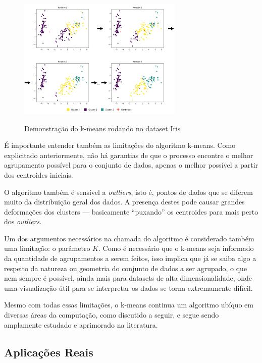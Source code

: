 \documentclass[12pt,
openright, 
oneside, %
a4paper,    %
brazil]{facom-ufu-abntex2}
\begin{document}
\begin{figure}[h]
  \caption{Demonstração do k-means rodando no dataset Iris}
  \centering
  \includegraphics[width=0.7\textwidth]{demo_kmeans_iris.png}
  \label{fig:kMeansDemoIris}
\end{figure}

É importante entender também as limitações do algoritmo k-means. Como explicitado anteriormente, não há garantias de que o processo encontre o melhor agrupamento possível para o conjunto de dados, apenas o melhor possível a partir dos centroides iniciais.

O algoritmo também é sensível a \textit{outliers}, isto é, pontos de dados que se diferem muito da distribuição geral dos dados. A presença destes pode causar grandes deformações dos clusters --- basicamente \enquote{puxando} os centroides para mais perto dos \textit{outliers}.

Um dos argumentos necessários na chamada do algoritmo é considerado também uma limitação: o parâmetro $K$. Como é necessário que o k-means seja informado da quantidade de agrupamentos a serem feitos, isso implica que já se saiba algo a respeito da natureza ou geometria do conjunto de dados a ser agrupado, o que nem sempre é possível, ainda mais para datasets de alta dimensionalidade, onde uma visualização útil para se interpretar os dados se torna extremamente difícil.

Mesmo com todas essas limitações, o k-means continua um algoritmo ubíquo em diversas áreas da computação, como discutido a seguir, e segue sendo amplamente estudado e aprimorado na literatura.


\subsection{Aplicações Reais}
\end{document}
